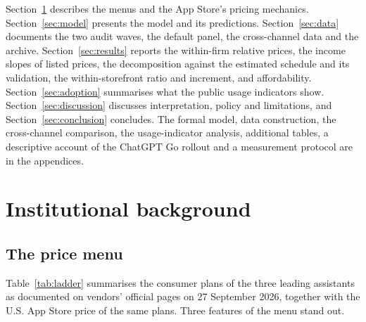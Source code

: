 \documentclass[11pt]{article}
\theoremstyle{definition}
\theoremstyle{remark}
\begin{document}
Section~\ref{sec:background} describes the menus and the App Store's pricing mechanics. Section~\ref{sec:model} presents the model and its predictions. Section~\ref{sec:data} documents the two audit waves, the default panel, the cross-channel data and the archive. Section~\ref{sec:results} reports the within-firm relative prices, the income slopes of listed prices, the decomposition against the estimated schedule and its validation, the within-storefront ratio and increment, and affordability. Section~\ref{sec:adoption} summarises what the public usage indicators show. Section~\ref{sec:discussion} discusses interpretation, policy and limitations, and Section~\ref{sec:conclusion} concludes. The formal model, data construction, the cross-channel comparison, the usage-indicator analysis, additional tables, a descriptive account of the ChatGPT Go rollout and a measurement protocol are in the appendices.
\section{Institutional background}\label{sec:background}

\subsection{The price menu}

Table~\ref{tab:ladder} summarises the consumer plans of the three leading assistants as documented on vendors' official pages on 27 September 2026, together with the U.S. App Store price of the same plans. Three features of the menu stand out.
\end{document}
